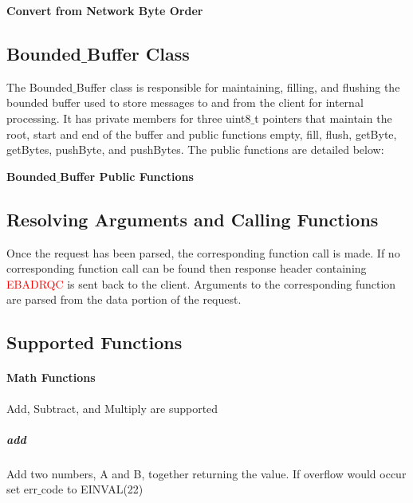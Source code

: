 \documentclass[11pt,letterpaper]{article}
\begin{document}
\begin{minipage}{\linewidth}

\vspace{-.5cm}\begin{center}
\footnotesize{\textbf{Convert from Network Byte Order}}
\end{center}
\end{minipage}

\subsection{Bounded$\_$Buffer Class}

The Bounded$\_$Buffer class is responsible for maintaining, filling, and flushing the bounded buffer used to store messages to and from the client for internal processing. It has private members for three uint8$\_$t pointers that maintain the root, start and end of the buffer and public functions empty, fill, flush, getByte, getBytes, pushByte, and pushBytes. The public functions are detailed below:


\vspace{-.5cm}\begin{center}
\footnotesize{\textbf{Bounded$\_$Buffer Public Functions}}
\end{center}

\subsection{Resolving Arguments and Calling Functions}

Once the request has been parsed, the corresponding function call is made. If no corresponding function call can be found then response header containing \textcolor{red}{EBADRQC} is sent back to the client. Arguments to the corresponding function are parsed from the data portion of the request.

\pagebreak  
\subsection{Supported Functions}
\paragraph*{Math Functions} Add, Subtract, and Multiply are supported\par
\vspace{.5cm}\begin{minipage}{\linewidth}
\subparagraph*{add} Add two numbers, A and B, together returning the value. If overflow would occur set err$\_$code to EINVAL(22)

\end{minipage}\\\\
\end{document}
